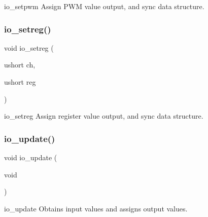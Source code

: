 io\+\_\+setpwm Assign P\+WM value output, and sync data structure. \mbox{\label{io_8c_ac46d8aef8b4048ef2b6508d0e96190a1}} 
\subsubsection{io\+\_\+setreg()}
{\footnotesize\ttfamily void io\+\_\+setreg (\begin{DoxyParamCaption}\item[{ushort}]{ch,  }\item[{ushort}]{reg }\end{DoxyParamCaption})}

io\+\_\+setreg Assign register value output, and sync data structure. \mbox{\label{io_8c_ae61292b63ed2e10396f8c35bcdaf8986}} 
\subsubsection{io\+\_\+update()}
{\footnotesize\ttfamily void io\+\_\+update (\begin{DoxyParamCaption}\item[{void}]{ }\end{DoxyParamCaption})}

io\+\_\+update Obtains input values and assigns output values. 